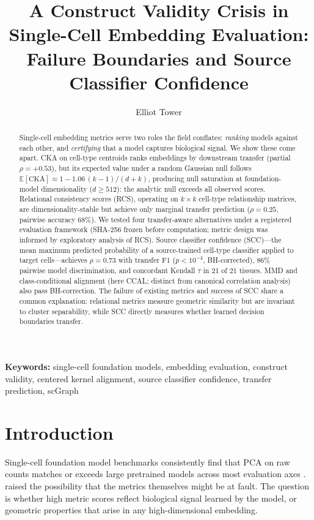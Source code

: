 \documentclass[11pt]{article}
\title{A Construct Validity Crisis in Single-Cell Embedding Evaluation:\\
Failure Boundaries and Source Classifier Confidence}
\author{Elliot Tower}
\affil{Independent Researcher \\ \texttt{elliot@elliottower.ai}}
\date{}
\begin{document}
\linenumbers
\maketitle

\begin{abstract}
Single-cell embedding metrics serve two roles the field conflates:
\emph{ranking} models against each other, and \emph{certifying} that a
model captures biological signal. We show these come apart. CKA on
cell-type centroids ranks embeddings by downstream transfer (partial
$\rho = +0.53$), but its expected value under a random Gaussian null
follows $\mathbb{E}[\mathrm{CKA}] \approx 1 -
1.06\,(k{-}1)/(d{+}k)$, producing null saturation at foundation-model
dimensionality ($d \geq 512$): the analytic null exceeds all observed
scores. Relational consistency scores (RCS), operating on $k \times k$
cell-type relationship matrices, are dimensionality-stable but achieve
only marginal transfer prediction ($\rho = 0.25$, pairwise accuracy
68\%). We tested four transfer-aware alternatives under a registered
evaluation framework (SHA-256 frozen before computation; metric design
was informed by exploratory analysis of RCS). Source classifier
confidence (SCC)---the mean maximum predicted probability of a
source-trained cell-type classifier applied to target cells---achieves
$\rho = 0.73$ with transfer F1 ($p < 10^{-4}$, BH-corrected), 86\%
pairwise model discrimination, and concordant Kendall $\tau$ in 21 of
21 tissues. MMD and class-conditional alignment (here CCAL; distinct from canonical
correlation analysis) also pass BH-correction. The failure of existing metrics and success of SCC
share a common explanation: relational metrics measure geometric
similarity but are invariant to cluster separability, while SCC
directly measures whether learned decision boundaries transfer.
\end{abstract}

\noindent\textbf{Keywords:} single-cell foundation models, embedding evaluation, construct validity, centered kernel alignment, source classifier confidence, transfer prediction, scGraph

\section{Introduction}
\label{sec:intro}

Single-cell foundation model benchmarks consistently find that PCA on
raw counts matches or exceeds large pretrained models across most
evaluation axes \citep{wu2025scfm, vcbench2026, unifiedscfm2026,
cellxgeneintegration2026}. \citet{wu2025scfm} raised the possibility
that the metrics themselves might be at fault. The question is whether
high metric scores reflect biological signal learned by the model, or
geometric properties that arise in any high-dimensional embedding.
\end{document}

